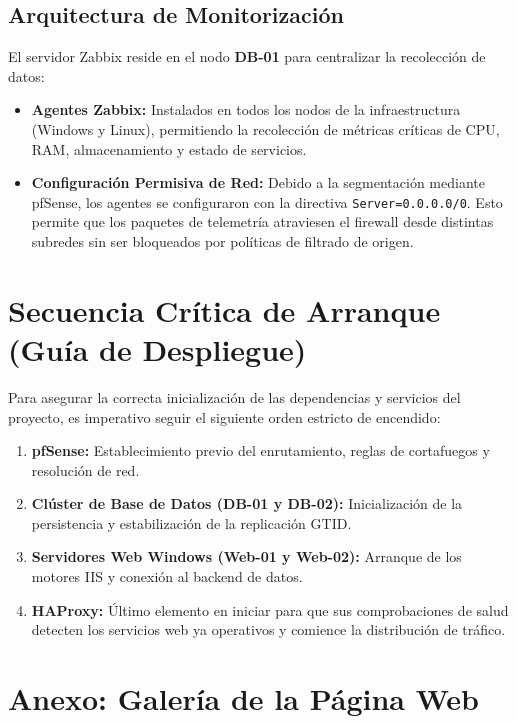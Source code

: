 \documentclass[12pt,a4paper]{article}
\begin{document}
\subsection{Arquitectura de Monitorización}
El servidor Zabbix reside en el nodo \textbf{DB-01} para centralizar la recolección de datos:
\begin{itemize}
    \item \textbf{Agentes Zabbix:} Instalados en todos los nodos de la infraestructura (Windows y Linux), permitiendo la recolección de métricas críticas de CPU, RAM, almacenamiento y estado de servicios.
    \item \textbf{Configuración Permisiva de Red:} Debido a la segmentación mediante pfSense, los agentes se configuraron con la directiva \texttt{Server=0.0.0.0/0}. Esto permite que los paquetes de telemetría atraviesen el firewall desde distintas subredes sin ser bloqueados por políticas de filtrado de origen.
\end{itemize}

\section{Secuencia Crítica de Arranque (Guía de Despliegue)}
\label{SecuenciaArranque}
Para asegurar la correcta inicialización de las dependencias y servicios del proyecto, es imperativo seguir el siguiente orden estricto de encendido:

\begin{enumerate}
    \item \textbf{pfSense:} Establecimiento previo del enrutamiento, reglas de cortafuegos y resolución de red.
    \item \textbf{Clúster de Base de Datos (DB-01 y DB-02):} Inicialización de la persistencia y estabilización de la replicación GTID.
    \item \textbf{Servidores Web Windows (Web-01 y Web-02):} Arranque de los motores IIS y conexión al backend de datos.
    \item \textbf{HAProxy:} Último elemento en iniciar para que sus comprobaciones de salud detecten los servicios web ya operativos y comience la distribución de tráfico.
\end{enumerate}


\newpage
\section{Anexo: Galería de la Página Web}
\label{GaleriaPáginaWeb}
\end{document}
